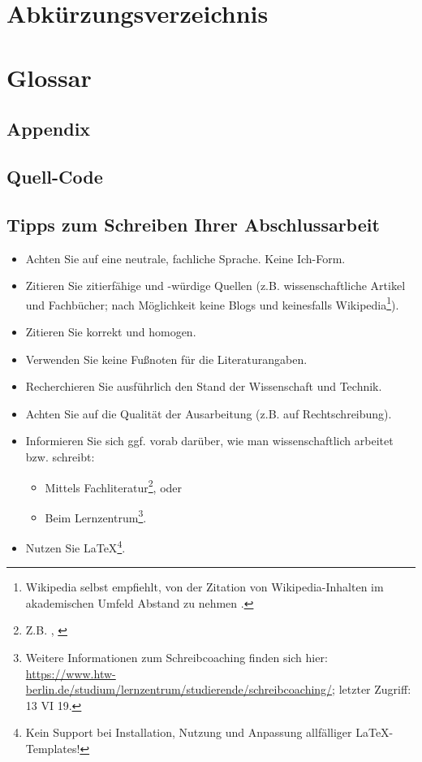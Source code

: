 \documentclass[oneside,bibliography=totocnumbered,BCOR=5mm]{scrbook}
\begin{document}
\printbibliography[
heading=bibintoc,
title={Quellenverzeichnis}
]


\newpage

\chapter{Abk\"urzungsverzeichnis}
\newpage
\chapter{Glossar}




\begin{appendix}


\chapter{Appendix}


\section{Quell-Code}

\section{Tipps zum Schreiben Ihrer Abschlussarbeit}

\begin{itemize}
\item Achten Sie auf eine neutrale, fachliche Sprache. Keine \glqq{}Ich\grqq{}-Form.
\item Zitieren Sie zitierf\"ahige und -w\"urdige Quellen (z.B. wissenschaftliche Artikel und Fachb\"ucher; nach M\"oglichkeit keine Blogs und keinesfalls Wikipedia\footnote{Wikipedia selbst empfiehlt, von der Zitation von Wikipedia-Inhalten im akademischen Umfeld Abstand zu nehmen \autocite{wikipedia2019}.}).
\item Zitieren Sie korrekt und homogen.
\item Verwenden Sie keine Fu{\ss}noten f\"ur die Literaturangaben.
\item Recherchieren Sie ausf\"uhrlich den Stand der Wissenschaft und Technik.
\item Achten Sie auf die Qualit\"at der Ausarbeitung (z.B. auf Rechtschreibung).
\item Informieren Sie sich ggf. vorab dar\"uber, wie man wissenschaftlich arbeitet bzw. schreibt:
\begin{itemize}
\item Mittels Fachliteratur\footnote{Z.B. \autocite{balzert2011}, \autocite{franck2013}}, oder
\item Beim Lernzentrum\footnote{Weitere Informationen zum Schreibcoaching finden sich hier: \url{https://www.htw-berlin.de/studium/lernzentrum/studierende/schreibcoaching/}; letzter Zugriff: 13 VI 19.}.
\end{itemize}
\item Nutzen Sie \LaTeX\footnote{Kein Support bei Installation, Nutzung und Anpassung allf\"alliger \LaTeX-Templates!}.
\end{itemize}




\end{appendix}
\end{document}
